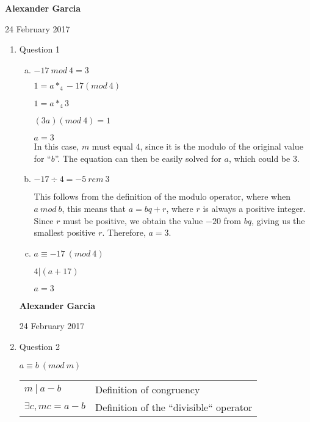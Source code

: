 \documentclass[11pt]{article}
\begin{document}
\textbf{Alexander Garcia}

24 February 2017 \\

\begin{enumerate}

	\item Question 1

		\begin{enumerate}[(a)]

			\item $-17\ mod\ 4 = 3$

			$1 = a *_4 -17 (mod\ 4)$

			$1 = a * _4 3$

			$(3a)(mod\ 4) = 1$

			$a = 3$\\

			In this case, $m$ must equal $4$, since it is the modulo of the original value for
			``$b$''. The equation can then be easily solved for $a$, which could be 3. \\

			\item $-17 \div 4 = -5\ rem\ 3$

			This follows from the definition of the modulo operator, where when $a\ mod\ b$,
			this means that $a = bq + r$, where $r$ is always a positive integer. Since $r$ must
			be positive, we obtain the value $-20$ from $bq$, giving us the smallest positive $r$.
			Therefore, $a = 3$. \\

			\item $a \equiv -17\ (mod\ 4)$

			$4 | (a+17)$

			$a = 3$ \\

		\end{enumerate}

	\newpage

	\textbf{Alexander Garcia}	

	24 February 2017 \\

	\item Question 2
		
		$a \equiv b\ (mod\ m)$ 

		\begin{tabular}{ll}
			$m\ |\ a-b$ & Definition of congruency \\

			$\exists c, mc = a-b$ & Definition of the ``divisible`` operator \\ 


\end{tabular}
\end{enumerate}
\end{document}
